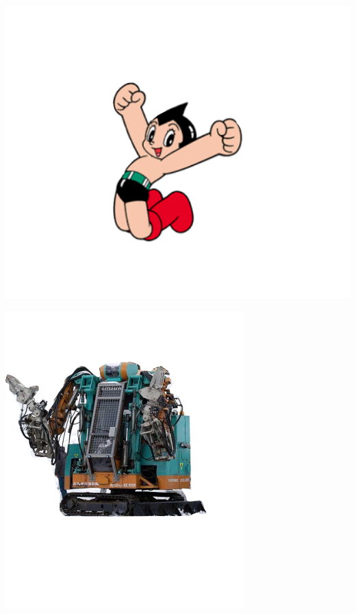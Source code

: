 \begin{container-fluid}
\begin{row-fluid}
\begin{span6}
\includegraphics{img/astro/1.png}
\end{span6}
\begin{span6}
\includegraphics{img/rescue/1.png}
\end{span6}
\end{row-fluid}
\begin{row-fluid}
\begin{span12}
\begin{xlarge}
　
\end{xlarge}
\end{span12}
\end{row-fluid}
\end{container-fluid}

